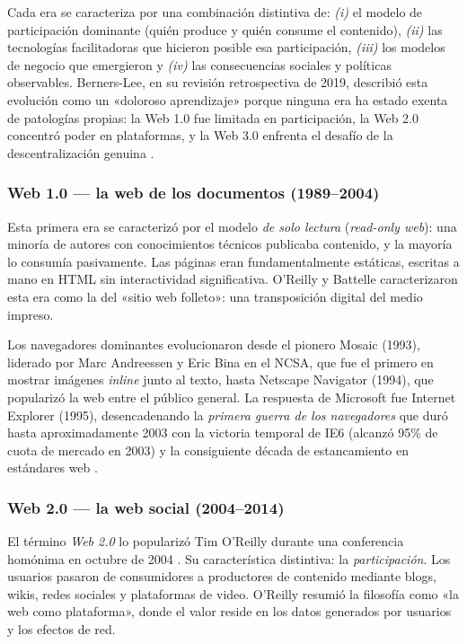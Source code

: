 \documentclass[11pt,a4paper,openany]{book}
\begin{document}
Cada era se caracteriza por una combinación distintiva de:
\emph{(i)} el modelo de participación dominante (quién produce y quién
consume el contenido), \emph{(ii)} las tecnologías facilitadoras que
hicieron posible esa participación, \emph{(iii)} los modelos de
negocio que emergieron y \emph{(iv)} las consecuencias sociales y
políticas observables. Berners-Lee, en su revisión retrospectiva de
2019, describió esta evolución como un «doloroso aprendizaje»
porque ninguna era ha estado exenta de patologías propias: la Web 1.0
fue limitada en participación, la Web 2.0 concentró poder en
plataformas, y la Web 3.0 enfrenta el desafío de la
descentralización genuina \cite{bernerslee2019contract}.

\subsubsection{Web 1.0 --- la web de los documentos (1989--2004)}

Esta primera era se caracterizó por el modelo \emph{de solo lectura}
(\emph{read-only web}): una minoría de autores con conocimientos
técnicos publicaba contenido, y la mayoría lo consumía pasivamente.
Las páginas eran fundamentalmente estáticas, escritas a mano en HTML
sin interactividad significativa. O'Reilly y Battelle
\cite{oreilly2009web2} caracterizaron esta era como la del «sitio web
folleto»: una transposición digital del medio impreso.

Los navegadores dominantes evolucionaron desde el pionero Mosaic
(1993), liderado por Marc Andreessen y Eric Bina en el NCSA, que fue
el primero en mostrar imágenes \emph{inline} junto al texto, hasta
Netscape Navigator (1994), que popularizó la web entre el público
general. La respuesta de Microsoft fue Internet Explorer (1995),
desencadenando la \emph{primera guerra de los navegadores} que duró
hasta aproximadamente 2003 con la victoria temporal de IE6 (alcanzó
95\% de cuota de mercado en 2003) y la consiguiente década de
estancamiento en estándares web \cite{zeldman2010designing}.

\subsubsection{Web 2.0 --- la web social (2004--2014)}

El término \emph{Web 2.0} lo popularizó Tim O'Reilly durante una
conferencia homónima en octubre de 2004 \cite{oreilly2005what}. Su
característica distintiva: la \emph{participación}. Los usuarios
pasaron de consumidores a productores de contenido mediante blogs,
wikis, redes sociales y plataformas de video. O'Reilly resumió la
filosofía como «la web como plataforma», donde el valor reside en los
datos generados por usuarios y los efectos de red.
\end{document}
